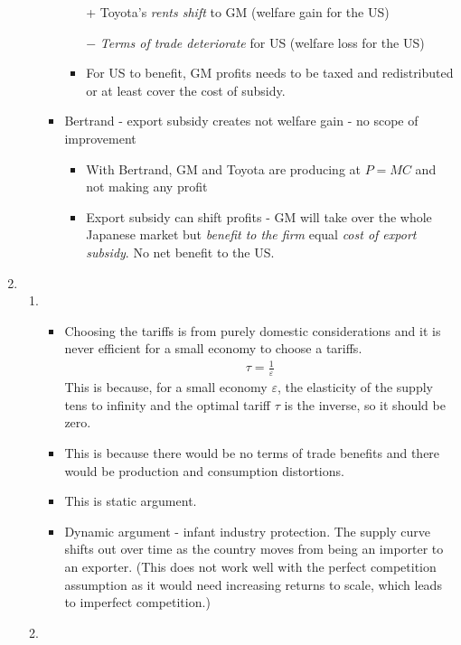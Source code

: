 \begin{enumerate}
\begin{enumerate}
\begin{itemize}
\begin{itemize}
				\item [+] Toyota's \emph{rents shift} to GM (welfare gain for the US)
				\item [$-$] \emph{Terms of trade deteriorate} for US (welfare loss for the US)
				\item For US to benefit, GM profits needs to be taxed and redistributed or at least cover the cost of subsidy.
			\end{itemize}
			\item Bertrand - export subsidy creates not welfare gain - no scope of improvement
			\begin{itemize}
				\item With Bertrand, GM and Toyota are producing at $P=MC$ and not making any profit
				\item Export subsidy can shift profits - GM will take over the whole Japanese market but \emph{benefit to the firm} equal \emph{cost of export subsidy}. No net benefit to the US.
			\end{itemize}
		\end{itemize}
	\end{enumerate}
	\item 
	\begin{enumerate}
		\item {} 
		\begin{itemize}
			\item Choosing the tariffs is from purely domestic considerations and it is never efficient for a small economy to choose a tariffs. 
			\begin{align*}
				\tau = \frac{1}{\varepsilon}
			\end{align*}
			This is because, for a small economy $\varepsilon$, the elasticity of the supply tens to infinity and the optimal tariff $\tau$ is the inverse, so it should be zero. 
			\item This is because there would be no terms of trade benefits and there would be production and consumption distortions.
			\item This is static argument.
			\item Dynamic argument - infant industry protection. The supply curve shifts out over time as the country moves from being an importer to an exporter. (This does not work well with the perfect competition assumption as it would need increasing returns to scale, which leads to imperfect competition.)
		\end{itemize}
		\item {}

\end{enumerate}
\end{enumerate}
